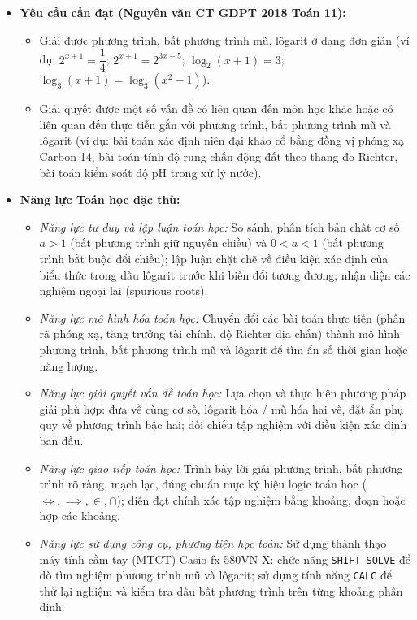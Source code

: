 \documentclass[12pt, a4paper]{article}
\begin{document}
\begin{itemize}[leftmargin=1.2cm]
    \item \textbf{Yêu cầu cần đạt (Nguyên văn CT GDPT 2018 Toán 11):}
    \begin{itemize}[leftmargin=0.6cm]
        \item Giải được phương trình, bất phương trình mũ, lôgarit ở dạng đơn giản (ví dụ: $2^{x+1} = \dfrac{1}{4}$; $2^{x+1} = 2^{3x+5}$; $\log_2(x+1) = 3$; $\log_3(x+1) = \log_3(x^2-1)$).
        \item Giải quyết được một số vấn đề có liên quan đến môn học khác hoặc có liên quan đến thực tiễn gắn với phương trình, bất phương trình mũ và lôgarit (ví dụ: bài toán xác định niên đại khảo cổ bằng đồng vị phóng xạ Carbon-14, bài toán tính độ rung chấn động đất theo thang đo Richter, bài toán kiểm soát độ pH trong xử lý nước).
    \end{itemize}

    \item \textbf{Năng lực Toán học đặc thù:}
    \begin{itemize}[leftmargin=0.6cm]
        \item \textit{Năng lực tư duy và lập luận toán học:} So sánh, phân tích bản chất cơ số $a > 1$ (bất phương trình giữ nguyên chiều) và $0 < a < 1$ (bất phương trình bắt buộc đổi chiều); lập luận chặt chẽ về điều kiện xác định của biểu thức trong dấu lôgarit trước khi biến đổi tương đương; nhận diện các nghiệm ngoại lai (spurious roots).
        \item \textit{Năng lực mô hình hóa toán học:} Chuyển đổi các bài toán thực tiễn (phân rã phóng xạ, tăng trưởng tài chính, độ Richter địa chấn) thành mô hình phương trình, bất phương trình mũ và lôgarit để tìm ẩn số thời gian hoặc năng lượng.
        \item \textit{Năng lực giải quyết vấn đề toán học:} Lựa chọn và thực hiện phương pháp giải phù hợp: đưa về cùng cơ số, lôgarit hóa / mũ hóa hai vế, đặt ẩn phụ quy về phương trình bậc hai; đối chiếu tập nghiệm với điều kiện xác định ban đầu.
        \item \textit{Năng lực giao tiếp toán học:} Trình bày lời giải phương trình, bất phương trình rõ ràng, mạch lạc, đúng chuẩn mực ký hiệu logic toán học ($\iff, \implies, \in, \cap$); diễn đạt chính xác tập nghiệm bằng khoảng, đoạn hoặc hợp các khoảng.
        \item \textit{Năng lực sử dụng công cụ, phương tiện học toán:} Sử dụng thành thạo máy tính cầm tay (MTCT) Casio fx-580VN X: chức năng \texttt{SHIFT SOLVE} để dò tìm nghiệm phương trình mũ và lôgarit; sử dụng tính năng \texttt{CALC} để thử lại nghiệm và kiểm tra dấu bất phương trình trên từng khoảng phân định.
    \end{itemize}


\end{itemize}
\end{document}
